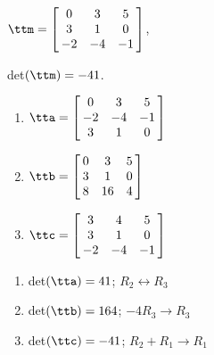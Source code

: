 {$\ttm=\left[\hskip -3pt \begin{array}{ccc} 0&3&5\\  3&1&0
\\  -2&-4&-1\end{array}\hskip -3pt \right] $,

 det$(\ttm)=-41$.
\begin{enumerate}
\item $\tta = \left[\hskip -3pt \begin{array}{ccc} 0&3&5\\  -2&-4&-1
\\  3&1&0\end{array}\hskip -3pt \right] $
\item	$\ttb = \left[\hskip -3pt \begin{array}{ccc} 0&3&5\\  3&1&0
\\  8&16&4\end{array}\hskip -3pt \right] $
\item	$\ttc = \left[\hskip -3pt \begin{array}{ccc} 3&4&5\\  3&1&0
\\  -2&-4&-1\end{array}\hskip -3pt \right] $
\end{enumerate}} 
{\begin{enumerate}
\item det$(\tta) = 41$; $R_2\leftrightarrow R_3$
\item det$(\ttb) = 164$; $-4R_3\rightarrow R_3$
\item det$(\ttc) = -41$; $R_2+R_1\rightarrow R_1$
\end{enumerate}}



  

